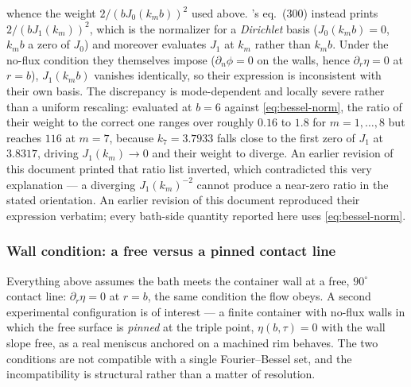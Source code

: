 whence the weight $2/(bJ_0(k_mb))^2$ used above. \cite{AlventosaEtAl2023}'s eq.~(300) instead prints $2/(bJ_1(k_m))^2$, which is the normalizer for a \emph{Dirichlet} basis ($J_0(k_mb)=0$, $k_mb$ a zero of $J_0$) and moreover evaluates $J_1$ at $k_m$ rather than $k_mb$. Under the no-flux condition they themselves impose ($\partial_n\phi=0$ on the walls, hence $\partial_r\eta=0$ at $r=b$), $J_1(k_mb)$ vanishes identically, so their expression is inconsistent with their own basis. The discrepancy is mode-dependent and locally severe rather than a uniform rescaling: evaluated at $b=6$ against \eqref{eq:bessel-norm}, the ratio of their weight to the correct one ranges over roughly $0.16$ to $1.8$ for $m=1,\dots,8$ but reaches $116$ at $m=7$, because $k_7=3.7933$ falls close to the first zero of $J_1$ at $3.8317$, driving $J_1(k_m)\to0$ and their weight to diverge. An earlier revision of this document printed that ratio list inverted, which contradicted this very explanation --- a diverging $J_1(k_m)^{-2}$ cannot produce a near-zero ratio in the stated orientation. An earlier revision of this document reproduced their expression verbatim; every bath-side quantity reported here uses \eqref{eq:bessel-norm}.

\subsubsection{Wall condition: a free versus a pinned contact line}
\label{subsubsec:wall}

Everything above assumes the bath meets the container wall at a free, $90^\circ$ contact line: $\partial_r\eta=0$ at $r=b$, the same condition the flow obeys. A second experimental configuration is of interest --- a finite container with no-flux walls in which the free surface is \emph{pinned} at the triple point, $\eta(b,\tau)=0$ with the wall slope free, as a real meniscus anchored on a machined rim behaves. The two conditions are not compatible with a single Fourier--Bessel set, and the incompatibility is structural rather than a matter of resolution.

